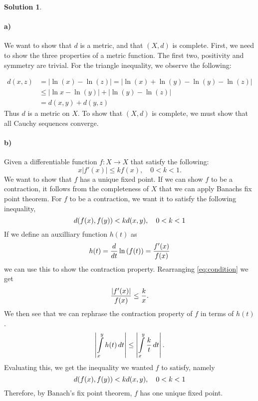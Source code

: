 \documentclass[a4paper]{article}
\theoremstyle{definition}
\newtheorem{sol}{Solution}
\begin{document}
\begin{sol}
\item\paragraph{a)}
We want to show that $d$ is a metric, and that $\left( X, d \right)$ is
complete.  First, we need to show the three properties of a metric function.
The first two, positivity and symmetry are trivial.  For the triangle
inequality, we observe the following:

\begin{align*}
  d(x, z) &= | \ln(x) - \ln(z)| = | \ln(x) + \ln(y) - \ln(y) - \ln(z) | \\
          &\leq |\ln x - \ln(y) | + |\ln(y) - \ln(z) | \\
          &= d(x, y) + d(y, z)
\end{align*}
Thus $d$ is a metric on $X$. To show that $\left( X, d \right)$ is complete, we
must show that all Cauchy sequences converge.

\paragraph{b)}

Given a differentiable function $f: X \longrightarrow X$ that satisfy the following:
\begin{equation}
  \label{eq:condition}
  x\left|f'(x)\right| \leq kf(x), \quad 0 < k < 1.
\end{equation}
We want to show that $f$ has a unique fixed point.  If we can show $f$ to be a
contraction, it follows from the completeness of $X$ that we can apply Banachs
fix point theorem.  For $f$ to be a contraction, we want it to satisfy the
following inequality,
\begin{equation}
  \notag
  d(f(x), f(y)) < kd(x, y), \quad 0 < k < 1
\end{equation}
If we define an auxilliary function $h(t)$ as
\begin{equation}
  \notag
  h(t) = \frac{d}{dt} \ln\left(f(t)\right)  = \frac{f'(x)}{f(x)}
\end{equation} 
we can use this to show the contraction property.  Rearranging
\eqref{eq:condition} we get
\begin{equation}
  \notag
  \frac{\left| f'(x)\right|}{f(x)} \leq \frac{k}{x}.
\end{equation}
We then see that we can rephrase the contraction property of $f$ in terms of $h(t)$.
\begin{equation}
  \notag
  \left| \int\limits_{x}^{y} h(t) \, dt  \right|  \leq \left| \int\limits_{x}^{y} \frac{k}{t} \, dt \right|.
\end{equation}
Evaluating this, we get the inequality we wanted $f$ to satisfy, namely
\begin{equation}
  \notag
  d(f(x), f(y)) < kd(x, y), \quad 0 < k < 1
  \end{equation}
  Therefore, by Banach's fix point theorem, $f$ has one unique fixed point.

\end{sol}
\end{document}
